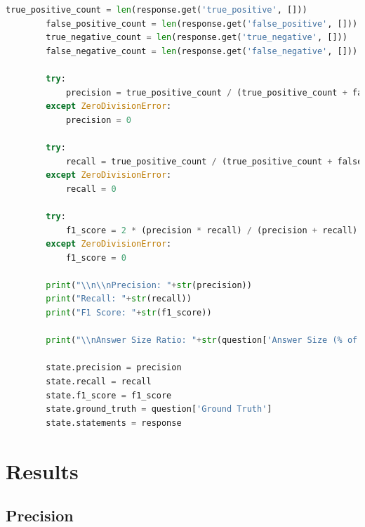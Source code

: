 \begin{lstlisting}[style=mystyle, language=Python, caption={C\'{o}digo para LLM-as-a-Judge}, label={code:llm-judge}]
        true_positive_count = len(response.get('true_positive', []))
        false_positive_count = len(response.get('false_positive', []))
        true_negative_count = len(response.get('true_negative', []))
        false_negative_count = len(response.get('false_negative', []))

        try:
            precision = true_positive_count / (true_positive_count + false_positive_count)
        except ZeroDivisionError:
            precision = 0
        
        try:
            recall = true_positive_count / (true_positive_count + false_negative_count)
        except ZeroDivisionError:
            recall = 0

        try:
            f1_score = 2 * (precision * recall) / (precision + recall)
        except ZeroDivisionError:
            f1_score = 0
            
        print("\\n\\nPrecision: "+str(precision))
        print("Recall: "+str(recall))
        print("F1 Score: "+str(f1_score))

        print("\\nAnswer Size Ratio: "+str(question['Answer Size (% of GT)']))

        state.precision = precision
        state.recall = recall
        state.f1_score = f1_score
        state.ground_truth = question['Ground Truth']
        state.statements = response
\end{lstlisting}

    \section{Results}
    \label{sec:exp2_appendix}

        \subsection{Precision}

